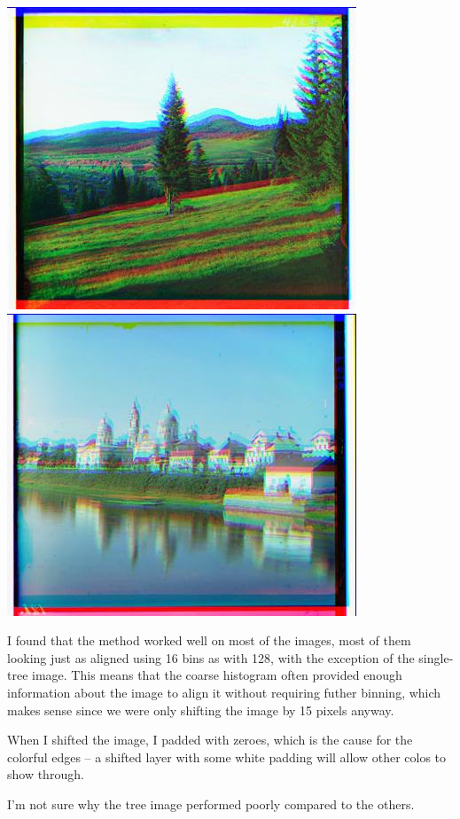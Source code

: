 \documentclass[12pt]{article}
\begin{document}
\begin{center}
\includegraphics[scale=0.6]{processed/processed-128-00600v.jpg}~
\includegraphics[scale=0.6]{processed/processed-128-01167v.jpg}
\end{center}

I found that the method worked well on most of the images, most of them looking just as aligned using 16 bins as with 128, with the exception of the single-tree image. This means that the coarse histogram often provided enough information about the image to align it without requiring futher binning, which makes sense since we were only shifting the image by 15 pixels anyway.

When I shifted the image, I padded with zeroes, which is the cause for the colorful edges -- a shifted layer with some white padding will allow other colos to show through.

I'm not sure why the tree image performed poorly compared to the others.
\end{document}
